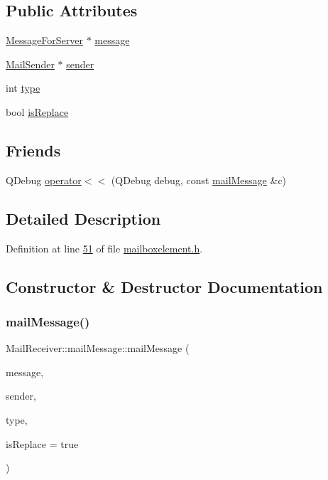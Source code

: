 \subsection*{Public Attributes}
\begin{DoxyCompactItemize}
\item 
\hyperlink{a00121}{Message\+For\+Server} $\ast$ \hyperlink{a00201_aa5878557546468fcfb65e099a5d4bf7d}{message}
\item 
\hyperlink{a00205}{Mail\+Sender} $\ast$ \hyperlink{a00201_a048079ebd149bb973368fd5bedb528a7}{sender}
\item 
int \hyperlink{a00201_ad301da15808225e62d84fd5e3cf33a1f}{type}
\item 
bool \hyperlink{a00201_afb7ab5377a6aa4a1e3d836d3e464a952}{is\+Replace}
\end{DoxyCompactItemize}
\subsection*{Friends}
\begin{DoxyCompactItemize}
\item 
Q\+Debug \hyperlink{a00201_a5082ba525e6289ae6fc923e40c68192f}{operator$<$$<$} (Q\+Debug debug, const \hyperlink{a00201}{mail\+Message} \&c)
\end{DoxyCompactItemize}


\subsection{Detailed Description}


Definition at line \hyperlink{a00002_source_l00051}{51} of file \hyperlink{a00002_source}{mailboxelement.\+h}.



\subsection{Constructor \& Destructor Documentation}
\mbox{\label{a00201_a0eaa6fb90637fea832337d73b9a83d4d}} 
\subsubsection{\texorpdfstring{mail\+Message()}{mailMessage()}}
{\footnotesize\ttfamily Mail\+Receiver\+::mail\+Message\+::mail\+Message (\begin{DoxyParamCaption}\item[{\hyperlink{a00121}{Message\+For\+Server} $\ast$}]{message,  }\item[{\hyperlink{a00205}{Mail\+Sender} $\ast$}]{sender,  }\item[{int}]{type,  }\item[{bool}]{is\+Replace = {\ttfamily true} }\end{DoxyParamCaption})\hspace{0.3cm}{\ttfamily [inline]}}



